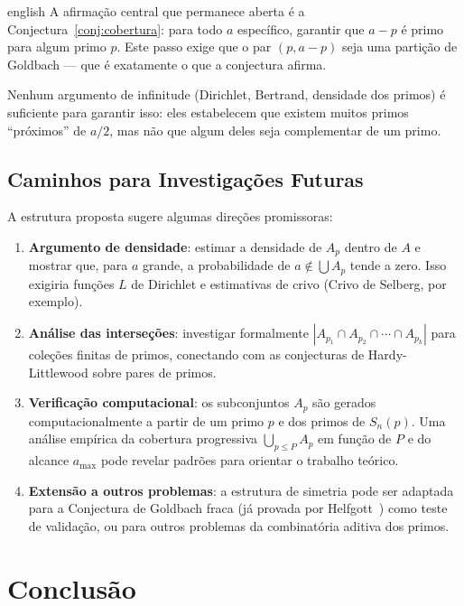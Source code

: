 \documentclass[a4paper,11pt]{article}
\theoremstyle{definition}
\theoremstyle{remark}
\begin{document}
\begin{otherlanguage*}{english}
		A afirmação central que permanece aberta é a
		Conjectura~\ref{conj:cobertura}: para todo $a$ específico, garantir que
		$a - p$ é primo para algum primo $p$. Este passo exige que o par $(p, a-p)$
		seja uma partição de Goldbach — que é exatamente o que a conjectura afirma.
		
		Nenhum argumento de infinitude (Dirichlet, Bertrand, densidade dos primos)
		é suficiente para garantir isso: eles estabelecem que existem muitos primos
		``próximos'' de $a/2$, mas não que algum deles seja complementar de um primo.
		
		\subsection{Caminhos para Investigações Futuras}
		
		A estrutura proposta sugere algumas direções promissoras:
		
		\begin{enumerate}
			\item \textbf{Argumento de densidade}: estimar a densidade de $A_p$ dentro
			de $A$ e mostrar que, para $a$ grande, a probabilidade de $a \notin
			\bigcup A_p$ tende a zero. Isso exigiria funções $L$ de Dirichlet e
			estimativas de crivo (Crivo de Selberg, por exemplo).
			
			\item \textbf{Análise das interseções}: investigar formalmente
			$|A_{p_1} \cap A_{p_2} \cap \dotsb \cap A_{p_k}|$ para coleções
			finitas de primos, conectando com as conjecturas de Hardy-Littlewood
			sobre pares de primos.
			
			\item \textbf{Verificação computacional}: os subconjuntos $A_p$ são
			gerados computacionalmente a partir de um primo $p$ e dos primos de
			$S_n(p)$. Uma análise empírica da cobertura progressiva $\bigcup_{p
				\leq P} A_p$ em função de $P$ e do alcance $a_{\max}$ pode revelar
			padrões para orientar o trabalho teórico.
			
			\item \textbf{Extensão a outros problemas}: a estrutura de simetria pode
			ser adaptada para a Conjectura de Goldbach fraca (já provada por
			Helfgott~\cite{Helfgott2013}) como teste de validação, ou para
			outros problemas da combinatória aditiva dos primos.
		\end{enumerate}
		
		\section{Conclusão}
		

\end{otherlanguage*}
\end{document}
